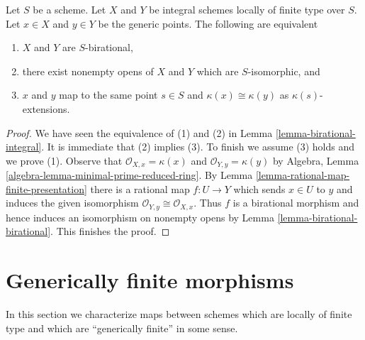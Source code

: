 \begin{lemma}
\label{lemma-common-open}
Let $S$ be a scheme. Let $X$ and $Y$ be integral schemes locally
of finite type over $S$. Let $x \in X$ and $y \in Y$ be the generic points.
The following are equivalent
\begin{enumerate}
\item $X$ and $Y$ are $S$-birational,
\item there exist nonempty opens of $X$ and $Y$ which are $S$-isomorphic, and
\item $x$ and $y$ map to the same point $s \in S$ and
$\kappa(x) \cong \kappa(y)$ as $\kappa(s)$-extensions.
\end{enumerate}
\end{lemma}

\begin{proof}
We have seen the equivalence of (1) and (2) in
Lemma \ref{lemma-birational-integral}.
It is immediate that (2) implies (3).
To finish we assume (3) holds and we prove (1).
Observe that $\mathcal{O}_{X, x} = \kappa(x)$ and
$\mathcal{O}_{Y, y} = \kappa(y)$ by
Algebra, Lemma \ref{algebra-lemma-minimal-prime-reduced-ring}.
By Lemma \ref{lemma-rational-map-finite-presentation}
there is a rational map $f : U \to Y$
which sends $x \in U$ to $y$ and induces
the given isomorphism $\mathcal{O}_{Y, y} \cong \mathcal{O}_{X, x}$.
Thus $f$ is a birational morphism and hence induces
an isomorphism on nonempty opens
by Lemma \ref{lemma-birational-birational}.
This finishes the proof.
\end{proof}







\section{Generically finite morphisms}
\label{section-generically-finite}

\noindent
In this section we characterize maps between schemes
which are locally of finite type and which are ``generically finite''
in some sense.

